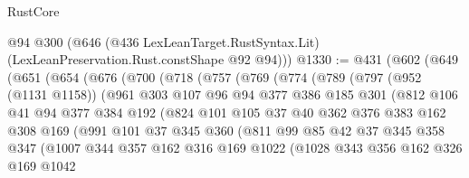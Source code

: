 \begin{lexlean}{RustCore}
\begin{coremodule}
      @94
      @300
      (@646 (@436 LexLeanTarget.RustSyntax.Lit) (LexLeanPreservation.Rust.constShape @92 @94)))
@1330 := @431
    (@602
      (@649
        (@651
          (@654
            (@676
              (@700
                (@718
                  (@757
                    (@769
                      (@774
                        (@789
                          (@797
                            (@952 (@1131 @1158))
                            (@961
                              @303
                              @107
                              @96
                              @94
                              @377
                              @386
                              @185
                              @301
                              (@812
                                @106
                                @41
                                @94
                                @377
                                @384
                                @192
                                (@824
                                  @101
                                  @105
                                  @37
                                  @40
                                  @362
                                  @376
                                  @383
                                  @162
                                  @308
                                  @169
                                  (@991
                                    @101
                                    @37
                                    @345
                                    @360
                                    (@811
                                      @99
                                      @85
                                      @42
                                      @37
                                      @345
                                      @358
                                      @347
                                      (@1007
                                        @344
                                        @357
                                        @162
                                        @316
                                        @169
                                        @1022
                                        (@1028
                                          @343
                                          @356
                                          @162
                                          @326
                                          @169
                                          @1042

\end{coremodule}
\end{lexlean}
